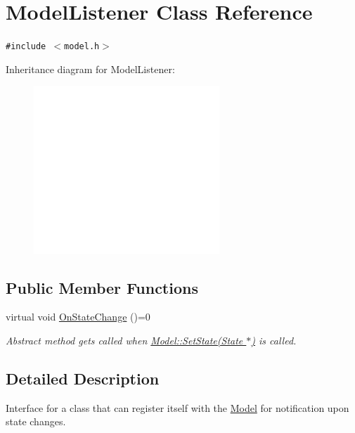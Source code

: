 \hypertarget{classModelListener}{
\section{ModelListener Class Reference}
\label{classModelListener}
}
{\tt \#include $<$model.h$>$}

Inheritance diagram for ModelListener:\nopagebreak
\begin{figure}[H]
\begin{center}
\leavevmode
\includegraphics[width=198pt]{classModelListener__inherit__graph}
\end{center}
\end{figure}
\subsection*{Public Member Functions}
\begin{CompactItemize}
\item 
virtual void \hyperlink{classModelListener_63070a6f75480904846b7cfc6389aa4c}{OnStateChange} ()=0
\begin{CompactList}\small\item\em Abstract method gets called when \hyperlink{classModel_8b2d324213cf67b2e139144a25c6e3c3}{Model::SetState(State $\ast$)} is called. \item\end{CompactList}\end{CompactItemize}


\subsection{Detailed Description}
Interface for a class that can register itself with the \hyperlink{classModel}{Model} for notification upon state changes.  

